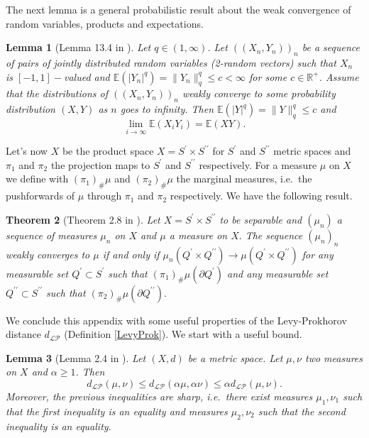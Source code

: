 \documentclass[11pt]{article}
\newtheorem{theorem}{Theorem}[section]
\newtheorem{lemma}[theorem]{Lemma}
\begin{document}
The next lemma is a general probabilistic result about the weak convergence of random variables, products and expectations.

\begin{lemma}[Lemma 13.4 in \cite{backhausz2018action}]\label{closedlem2} Let $q\in (1,\infty)$.  Let $((X_n,Y_n))_n$ be a sequence of pairs of jointly distributed random variables (2-random vectors) such that $X_n$ is $[-1,1]-$valued and $\mathbb{E}(|Y_n|^q)=\|Y_n\|_q^q\leq c<\infty$ for some $c\in\mathbb{R}^+$. Assume that the distributions of $((X_n,Y_n))_n$ weakly converge to some probability distribution $(X,Y)$ as $n$ goes to infinity. Then $\mathbb{E}(|Y|^q)=\|Y\|_q^q\leq c$ and $$\lim_{i\to\infty} \mathbb{E}(X_iY_i)=\mathbb{E}(XY).$$
\end{lemma}

Let's now $X$ be the product space $X=S^{\prime}\times S^{\prime \prime}$ for $S^{\prime}$ and $ S^{\prime \prime}$ metric spaces and $\pi_1$ and $\pi_2$ the projection maps to $S^{\prime}$ and $ S^{\prime \prime}$  respectively. For a measure $\mu$ on $X$ we define with ${(\pi_1)}_{\#}\mu$ and ${(\pi_2)}_{\#}\mu$ the marginal measures, i.e.\ the pushforwards of $\mu$ through $\pi_1$ and $\pi_2$ respectively. We have the following result.

\begin{theorem}[Theorem 2.8 in \cite{billingsley1968convergence}] \label{BillingWeakConv}
Let $X=S^{\prime}\times S^{\prime \prime}$ to be separable and $(\mu_n)$ a sequence of measures $\mu_n$ on $X$ and $\mu$ a measure on $X.$ The sequence $(\mu_n)_n$ weakly converges to $\mu$ if and only if $\mu_n(Q^{\prime }\times Q^{\prime \prime})\rightarrow \mu(Q^{\prime }\times Q^{\prime \prime})$ for any measurable set $Q^{\prime}\subset S^{\prime}$ such that ${(\pi_1)}_{\#}\mu(\partial Q^{\prime})$ and any measurable set $Q^{\prime \prime}\subset S^{\prime \prime}$ such that ${(\pi_2)}_{\#}\mu(\partial Q^{\prime\prime}).$
\end{theorem}

We conclude this appendix with some useful properties of the Levy-Prokhorov distance $d_{\mathcal{LP}}$ (Definition \ref{LevyProk}). We start with a useful bound.

\begin{lemma}[Lemma 2.4 in \cite{zucal2024probabilitygraphonsrightconvergence}]\label{LemmaIneqScalingProkhorov}
  Let $(X,d)$ be a metric space. Let $\mu,\nu$ two measures on $X$ and $\alpha \geq1$. Then 
$$
    d_{\mathcal{LP}}(\mu,\nu)\leq d_{\mathcal{LP}}(\alpha\mu,\alpha\nu)\leq \alpha d_{\mathcal{LP}}(\mu,\nu).$$ Moreover, the previous inequalities are sharp, i.e.\ there exist measures $\mu_1,\nu_1$ such that the first inequality is an equality and measures $\mu_2,\nu_2$ such that the second inequality is an equality.
\end{lemma}
\end{document}
